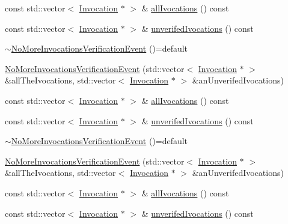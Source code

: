 \begin{DoxyCompactItemize}
\item 
const std\+::vector$<$ \mbox{\hyperlink{structfakeit_1_1Invocation}{Invocation}} $\ast$ $>$ \& \mbox{\hyperlink{structfakeit_1_1NoMoreInvocationsVerificationEvent_aa69cf6dc4a816429653a5885f38d07b5}{all\+Ivocations}} () const
\item 
const std\+::vector$<$ \mbox{\hyperlink{structfakeit_1_1Invocation}{Invocation}} $\ast$ $>$ \& \mbox{\hyperlink{structfakeit_1_1NoMoreInvocationsVerificationEvent_aaff3cb0916a4fe853f6f4e5fcc7f2632}{unverifed\+Ivocations}} () const
\item 
\mbox{\hyperlink{structfakeit_1_1NoMoreInvocationsVerificationEvent_a1db7bd8cb45dc62b87c744e628b93d4d}{$\sim$\+No\+More\+Invocations\+Verification\+Event}} ()=default
\item 
\mbox{\hyperlink{structfakeit_1_1NoMoreInvocationsVerificationEvent_a4c590fe7b3fb11f7121af65f4a0d3ed5}{No\+More\+Invocations\+Verification\+Event}} (std\+::vector$<$ \mbox{\hyperlink{structfakeit_1_1Invocation}{Invocation}} $\ast$ $>$ \&all\+The\+Ivocations, std\+::vector$<$ \mbox{\hyperlink{structfakeit_1_1Invocation}{Invocation}} $\ast$ $>$ \&an\+Unverifed\+Ivocations)
\item 
const std\+::vector$<$ \mbox{\hyperlink{structfakeit_1_1Invocation}{Invocation}} $\ast$ $>$ \& \mbox{\hyperlink{structfakeit_1_1NoMoreInvocationsVerificationEvent_aa69cf6dc4a816429653a5885f38d07b5}{all\+Ivocations}} () const
\item 
const std\+::vector$<$ \mbox{\hyperlink{structfakeit_1_1Invocation}{Invocation}} $\ast$ $>$ \& \mbox{\hyperlink{structfakeit_1_1NoMoreInvocationsVerificationEvent_aaff3cb0916a4fe853f6f4e5fcc7f2632}{unverifed\+Ivocations}} () const
\item 
\mbox{\hyperlink{structfakeit_1_1NoMoreInvocationsVerificationEvent_a1db7bd8cb45dc62b87c744e628b93d4d}{$\sim$\+No\+More\+Invocations\+Verification\+Event}} ()=default
\item 
\mbox{\hyperlink{structfakeit_1_1NoMoreInvocationsVerificationEvent_a4c590fe7b3fb11f7121af65f4a0d3ed5}{No\+More\+Invocations\+Verification\+Event}} (std\+::vector$<$ \mbox{\hyperlink{structfakeit_1_1Invocation}{Invocation}} $\ast$ $>$ \&all\+The\+Ivocations, std\+::vector$<$ \mbox{\hyperlink{structfakeit_1_1Invocation}{Invocation}} $\ast$ $>$ \&an\+Unverifed\+Ivocations)
\item 
const std\+::vector$<$ \mbox{\hyperlink{structfakeit_1_1Invocation}{Invocation}} $\ast$ $>$ \& \mbox{\hyperlink{structfakeit_1_1NoMoreInvocationsVerificationEvent_aa69cf6dc4a816429653a5885f38d07b5}{all\+Ivocations}} () const
\item 
const std\+::vector$<$ \mbox{\hyperlink{structfakeit_1_1Invocation}{Invocation}} $\ast$ $>$ \& \mbox{\hyperlink{structfakeit_1_1NoMoreInvocationsVerificationEvent_aaff3cb0916a4fe853f6f4e5fcc7f2632}{unverifed\+Ivocations}} () const
\end{DoxyCompactItemize}



